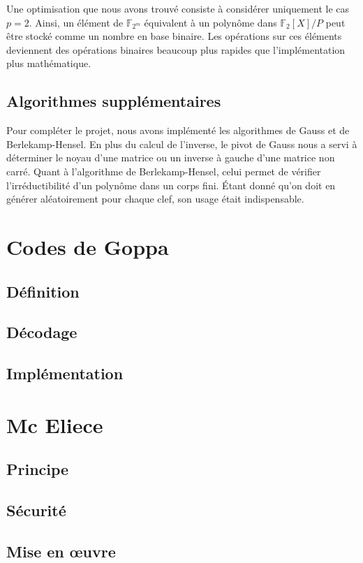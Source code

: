 \documentclass{article}
\begin{document}
			Une optimisation que nous avons trouvé consiste à considérer uniquement le cas $p = 2$.
			Ainsi, un élément de $\mathbb{F}_{2^{m}}$ équivalent à un polynôme dans $\mathbb{F}_{2}[X]/P$ peut être stocké comme un nombre en base binaire.
			Les opérations sur ces éléments deviennent des opérations binaires beaucoup plus rapides que l'implémentation plus mathématique.

		\subsection*{Algorithmes supplémentaires}
			Pour compléter le projet, nous avons implémenté les algorithmes de Gauss et de Berlekamp-Hensel.
			En plus du calcul de l'inverse, le pivot de Gauss nous a servi à déterminer le noyau d'une matrice ou un inverse à gauche d'une matrice non carré.
			Quant à l'algorithme de Berlekamp-Hensel, celui permet de vérifier l'irréductibilité d'un polynôme dans un corps fini.
			Étant donné qu'on doit en générer aléatoirement pour chaque clef, son usage était indispensable.

	\section*{Codes de Goppa}

		\subsection*{Définition}

		\subsection*{Décodage}

		\subsection*{Implémentation}


	\section*{Mc Eliece}

		\subsection*{Principe}

		\subsection*{Sécurité}

		\subsection*{Mise en œuvre}








\end{document}
